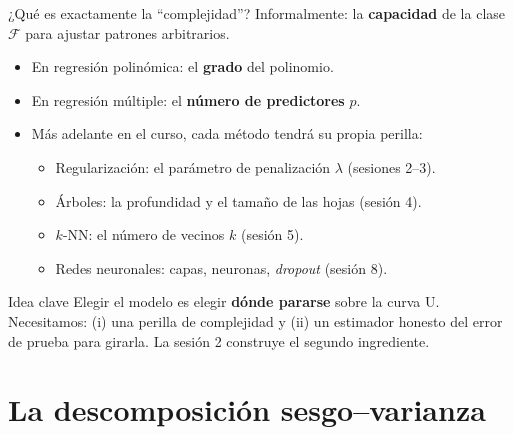 \documentclass{beamer}
\newcommand{\1}{\mathbb{I}}
\begin{document}
\begin{frame}{¿Qué es exactamente la ``complejidad''?}
\small
Informalmente: la \textbf{capacidad} de la clase $\mathcal{F}$ para ajustar patrones arbitrarios.
\pause
\vspace{0.2cm}
\begin{itemize}\itemsep5pt
  \item En regresión polinómica: el \textbf{grado} del polinomio.
  \item En regresión múltiple: el \textbf{número de predictores} $p$.
  \item Más adelante en el curso, cada método tendrá su propia perilla:
  \begin{itemize}\itemsep3pt
    \item Regularización: el parámetro de penalización $\lambda$ (sesiones 2--3).
    \item Árboles: la profundidad y el tamaño de las hojas (sesión 4).
    \item $k$-NN: el número de vecinos $k$ (sesión 5).
    \item Redes neuronales: capas, neuronas, \emph{dropout} (sesión 8).
  \end{itemize} \pause
\end{itemize}

\begin{block}{Idea clave}
Elegir el modelo es elegir \textbf{dónde pararse} sobre la curva U. Necesitamos: (i) una perilla de complejidad y (ii) un estimador honesto del error de prueba para girarla. La sesión 2 construye el segundo ingrediente.
\end{block}
\end{frame}


\section{La descomposición sesgo--varianza}
\begin{frame}[noframenumbering]
\tableofcontents[currentsection]
\end{frame}
\end{document}
